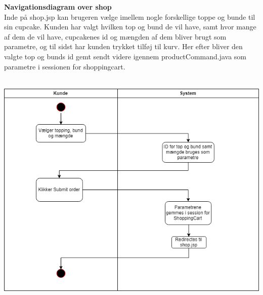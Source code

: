 \documentclass[11pt]{report}
\begin{document}
\noindent
\textbf{Navigationsdiagram over shop}\\
Inde på shop.jsp kan brugeren vælge imellem nogle forskellige toppe og bunde til sin cupcake. Kunden har valgt hvilken top og bund de vil have, samt hvor mange af dem de vil have, cupcakenes id og mængden af dem bliver brugt som parametre, og til sidst har kunden trykket tilføj til kurv. Her efter bliver den valgte top og bunds id gemt sendt videre igennem productCommand.java  som parametre i sessionen for shoppingcart.\\\\
\begin{center}
\includegraphics[width=15cm]{ShopCupcake.png}
\end{center}
\newpage
\end{document}
